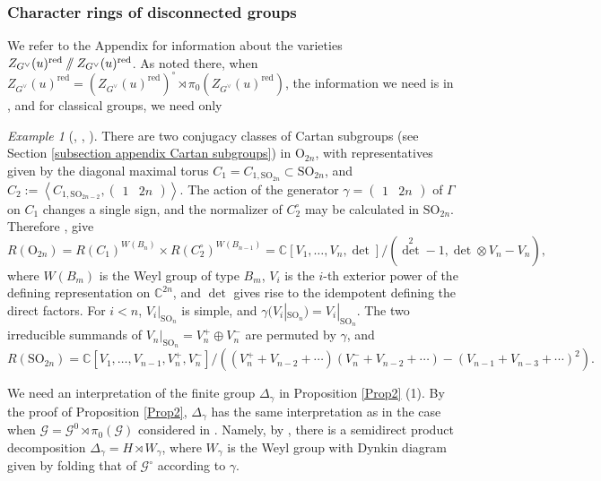 \documentclass[10pt]{article}
\newcommand{\bangles}[1]{\left\langle #1 \right\rangle}
\newcommand{\git}{\mathbin{
  \mathchoice{/\mkern-6mu/}%
    {/\mkern-6mu/}%
    {/\mkern-5mu/}%
    {/\mkern-5mu/}}}%
\newcommand{\Gg}{\mathcal{G}}
\newcommand{\C}{\mathbb{C}}
\newcommand{\SO}{\mathrm{SO}}
\newcommand{\OO}{\mathrm{O}}
\theoremstyle{definition}
\theoremstyle{remark}
\newtheorem{ex}{Example}
\newcommand{\Zur}{Z_{G^\vee}(u)^{\mathrm{red}}}
\newcommand{\Zz}{\mathcal{G}}
\begin{document}
\subsubsection{Character rings of disconnected groups}
\label{subsubsection rep rings of disconnected and Clifford theory}
We refer to the Appendix for information about the varieties $\Zur\git\Zur$. As noted there, when $\Zur=(\Zur)^\circ\rtimes\pi_0(\Zur)$, the information we need is in \cite{diss}, and for classical groups, we need only
%
\begin{ex}[\cite{Minami}, \cite{Tak}, \cite{Husemoller}]
\label{example rep ring of orthogonal groups}
There are two conjugacy classes of Cartan subgroups (see Section \ref{subsection appendix Cartan subgroups}) in $\OO_{2n}$, with representatives given by 
the diagonal maximal torus $C_1=C_{1,\SO_{2n}}\subset\SO_{2n}$, and 
$C_2:=\bangles{C_{1,\SO_{2n-2}}, \begin{pmatrix}1& 2n\end{pmatrix}}$. The action of the generator
$\gamma=\begin{pmatrix}1& 2n\end{pmatrix}$ of $\Gamma$ on $C_1$ changes a single sign, and the normalizer 
of $C_2^\circ$ may be calculated in $\SO_{2n}$. Therefore \cite{Minami}, \cite{Tak} give
%
\begin{equation}
\label{eqn RO(2n) direct factor presentation}
R(\OO_{2n})=R(C_1)^{W(B_n)}\times R(C_2^\circ)^{W(B_{n-1})}=\C[V_1,\dots, V_n,\det]/({\det}^2-1, \det\otimes V_n-V_n),
\end{equation}
%
where $W(B_{m})$ is the Weyl group of type $B_m$, $V_i$ is the $i$-th exterior power of the defining representation on $\C^{2n}$, and $\det$ gives rise to the idempotent defining the direct factors.
For $i<n$, $V_i|_{\SO_n}$ is simple, and $\gamma(V_i|_{\SO_n})=V_i|_{\SO_n}$.
The two irreducible summands of $V_n|_{\SO_n}=V_n^+\oplus V_n^-$ are permuted by $\gamma$, and 
%
\[
R(\SO_{2n})=\C[V_1,\dots,V_{n-1}, V_n^+, V_n^-]/\left((V_n^++V_{n-2}+\cdots )(V_n^-+V_{n-2}+\cdots )-
(V_{n-1}+V_{n-3}+\cdots)^2\right).
\]
%
\end{ex}
%
We need an interpretation of the finite group $\Delta_\gamma$ in Proposition \ref{Prop2} (1). By the proof of Proposition \ref{Prop2}, $\Delta_\gamma$ has the same interpretation as in the case when $\Gg=\Gg^0\rtimes\pi_0(\Gg)$ considered in \cite{diss}. Namely, by \cite[Lemma 3.9]{diss}, there is a semidirect product decomposition $\Delta_\gamma=H\rtimes W_\gamma$, where $W_\gamma$ is the Weyl group with Dynkin diagram given by folding that of $\Zz^\circ$ according to $\gamma$.
\end{document}
